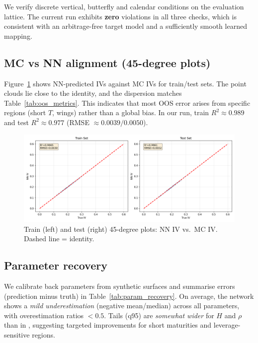	We verify discrete vertical, butterfly and calendar conditions on the evaluation lattice. The current run exhibits \textbf{zero} violations in all three checks, which is consistent with an arbitrage-free target model and a sufficiently smooth learned mapping.
	
	\subsection*{MC vs NN alignment (45-degree plots)}
	
	Figure~\ref{fig:fortyfive} shows NN-predicted IVs against MC IVs for train/test sets. The point clouds lie close to the identity, and the dispersion matches Table~\ref{tab:oos_metrics}. This indicates that most OOS error arises from specific regions (short $T$, wings) rather than a global bias. In our run, train $R^2\approx0.989$ and test $R^2\approx0.977$ (RMSE $\approx0.0039/0.0050$).
	
	\begin{figure}[t]
		\centering
		\includegraphics[width=\linewidth]{../images/45_degree_plot.png}
		\caption{Train (left) and test (right) 45-degree plots: NN IV vs.\ MC IV. Dashed line = identity.}
		\label{fig:fortyfive}
	\end{figure}
	
	\subsection*{Parameter recovery}
	
	We calibrate back parameters from synthetic surfaces and summarise errors (prediction minus truth) in Table~\ref{tab:param_recovery}. On average, the network shows a \emph{mild underestimation} (negative mean/median) across all parameters, with overestimation ratios $<0.5$. Tails (q95) are \emph{somewhat wider} for $H$ and $\rho$ than in \citet{Baschetti2024DeepCalibrationRandomGrids}, suggesting targeted improvements for short maturities and leverage-sensitive regions.
	
